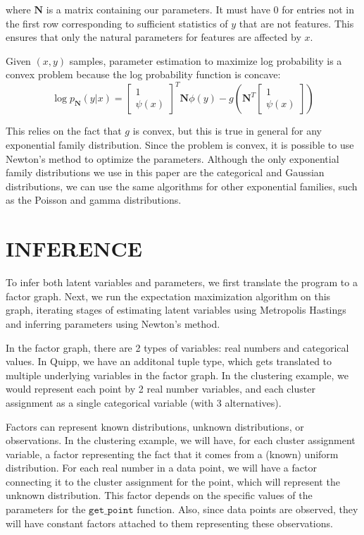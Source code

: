 \documentclass[proceed]{article}
\begin{document}
    where $\mathbf{N}$ is a matrix containing our parameters.  It must have 0 for entries not in the first
    row corresponding to sufficient statistics of $y$ that are not features.  This ensures that only the
    natural parameters for features are affected by $x$.

    Given $(x, y)$ samples, parameter estimation to maximize log probability is a convex
    problem because the log probability function is concave:
    $$\log p_{\mathbf{N}}(y | x) = \begin{bmatrix} 1 \\ \psi(x) \end{bmatrix} ^T \mathbf{N} \phi(y) - g\left(\mathbf{N}^T \begin{bmatrix} 1 \\ \psi(x) \end{bmatrix}\right)$$

    This relies on the fact that $g$ is convex, but this is true in general for any exponential family distribution.
    Since the problem is convex, it is possible to use Newton's method to optimize the parameters.  Although
    the only exponential family distributions we use in this paper are the categorical and Gaussian distributions,
    we can use the same algorithms for other exponential families, such as the Poisson and gamma distributions.

  \section{INFERENCE}

    To infer both latent variables and parameters, we first
    translate the program to a factor graph.  Next, we run the
    expectation maximization algorithm on this graph, iterating stages of
    estimating latent variables using Metropolis Hastings and inferring
    parameters using Newton's method.

    In the factor graph, there are 2 types of variables: real numbers
    and categorical values.
    In Quipp, we have an additonal tuple type, which gets translated
    to multiple underlying variables in the factor graph.  In the
    clustering example, we would represent each point by 2 real number variables,
    and each cluster assignment as a single categorical variable (with 3 alternatives).

    Factors can represent known distributions,
    unknown distributions, or observations.
    In the clustering example, we will have, for each cluster assignment variable,
    a factor representing the fact that it comes from a (known) uniform distribution.
    For each real number in a data point, we will have a factor connecting it to
    the cluster assignment for the point, which will represent the unknown distribution.
    This factor depends on the specific values of the parameters for the $\texttt{get\_point}$ function.
    Also, since data points are observed, they will have constant factors attached to them
    representing these observations.
\end{document}
